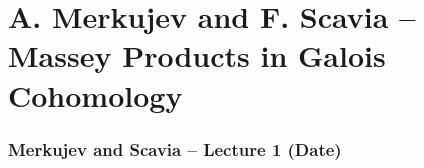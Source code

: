 \part{A. Merkujev and F. Scavia -- Massey Products in Galois Cohomology}
\section{Merkujev and Scavia -- Lecture 1 (Date)}
